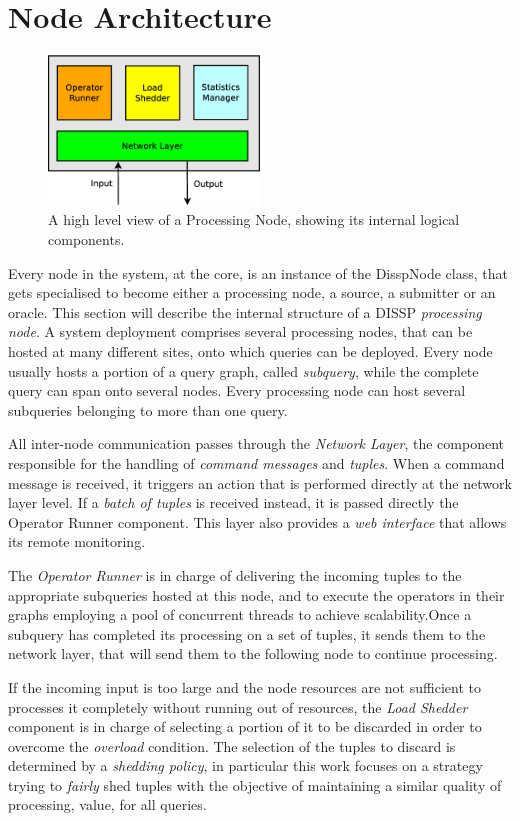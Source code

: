 \section{Node Architecture}
\label{sec:node-arch}	
\begin{figure}[b!]
	\centering
	\label{fig:node}	
		\includegraphics[width=0.5\textwidth]{img/tesi/node} 
		\caption{A high level view of a Processing Node, showing its internal logical components.}
\end{figure}
Every node in the system, at the core, is an instance of the DisspNode class, that gets specialised to
become either a processing node, a source, a submitter or an oracle. This section will describe the
internal structure of a DISSP \emph{processing node}. A system deployment comprises several processing
nodes, that can be hosted at many different sites, onto which queries can be deployed. Every node
usually hosts a portion of a query graph, called \emph{subquery}, while the complete query can span onto
several nodes. Every processing node can host several subqueries belonging to more than one query.

All inter-node communication passes through the \emph{Network Layer}, the component
responsible for the handling of \emph{command messages} and \emph{tuples}. When a command message is
received, it triggers an action that is performed directly at the network layer level. If a
\emph{batch of tuples} is received instead, it is passed directly the Operator Runner component. 
This layer also provides a \emph{web interface} that allows its remote monitoring.

The \emph{Operator Runner} is in charge of delivering the incoming tuples to the appropriate subqueries 
hosted at this node, and to execute the operators in their graphs employing a pool of concurrent threads
to achieve scalability.Once a subquery has completed its processing on a set of tuples, it sends them to
the network layer, that will send them to the following node to continue processing. 

If the incoming input is too large and the node resources are not sufficient to processes it completely
without running out of resources, the \emph{Load Shedder} component is in charge of selecting a portion
of it to be discarded in order to overcome the \emph{overload} condition. The selection of the tuples to
discard is determined by a \emph{shedding policy}, in particular this work focuses on a strategy trying
to \emph{fairly} shed tuples with the objective of maintaining a similar quality of processing, \sic value,
for all queries.
 
